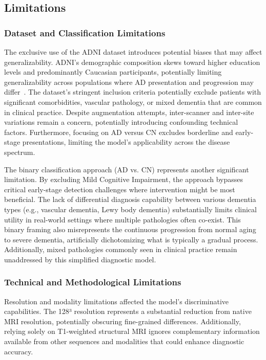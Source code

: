 \documentclass[11pt, a4paper]{article}
\begin{document}
\subsection{Limitations}

\subsubsection{Dataset and Classification Limitations}

The exclusive use of the ADNI dataset introduces potential biases that may affect generalizability. ADNI's demographic composition skews toward higher education levels and predominantly Caucasian participants, potentially limiting generalizability across populations where AD presentation and progression may differ~\cite{jack2008alzheimer}. The dataset's stringent inclusion criteria potentially exclude patients with significant comorbidities, vascular pathology, or mixed dementia that are common in clinical practice. Despite augmentation attempts, inter-scanner and inter-site variations remain a concern, potentially introducing confounding technical factors. Furthermore, focusing on AD versus CN excludes borderline and early-stage presentations, limiting the model's applicability across the disease spectrum.

The binary classification approach (AD vs. CN) represents another significant limitation. By excluding Mild Cognitive Impairment, the approach bypasses critical early-stage detection challenges where intervention might be most beneficial. The lack of differential diagnosis capability between various dementia types (e.g., vascular dementia, Lewy body dementia) substantially limits clinical utility in real-world settings where multiple pathologies often co-exist. This binary framing also misrepresents the continuous progression from normal aging to severe dementia, artificially dichotomizing what is typically a gradual process. Additionally, mixed pathologies commonly seen in clinical practice remain unaddressed by this simplified diagnostic model.

\subsubsection{Technical and Methodological Limitations}

Resolution and modality limitations affected the model's discriminative capabilities. The 128³ resolution represents a substantial reduction from native MRI resolution, potentially obscuring fine-grained differences. Additionally, relying solely on T1-weighted structural MRI ignores complementary information available from other sequences and modalities that could enhance diagnostic accuracy.
\end{document}

